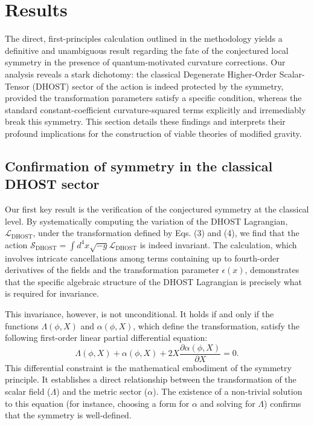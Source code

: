 \documentclass[twocolumn]{aastex631}
\begin{document}
\section{Results}
\label{sec:results}
The direct, first-principles calculation outlined in the methodology yields a definitive and unambiguous result regarding the fate of the conjectured local symmetry in the presence of quantum-motivated curvature corrections. Our analysis reveals a stark dichotomy: the classical Degenerate Higher-Order Scalar-Tensor (DHOST) sector of the action is indeed protected by the symmetry, provided the transformation parameters satisfy a specific condition, whereas the standard constant-coefficient curvature-squared terms explicitly and irremediably break this symmetry. This section details these findings and interprets their profound implications for the construction of viable theories of modified gravity.

\subsection{Confirmation of symmetry in the classical DHOST sector}

Our first key result is the verification of the conjectured symmetry at the classical level. By systematically computing the variation of the DHOST Lagrangian, $\mathcal{L}_{\text{DHOST}}$, under the transformation defined by Eqs. (3) and (4), we find that the action $\mathcal{S}_{\text{DHOST}} = \int d^4x \sqrt{-g} \mathcal{L}_{\text{DHOST}}$ is indeed invariant. The calculation, which involves intricate cancellations among terms containing up to fourth-order derivatives of the fields and the transformation parameter $\epsilon(x)$, demonstrates that the specific algebraic structure of the DHOST Lagrangian is precisely what is required for invariance.

This invariance, however, is not unconditional. It holds if and only if the functions $\Lambda(\phi, X)$ and $\alpha(\phi, X)$, which define the transformation, satisfy the following first-order linear partial differential equation:
\begin{equation}
\Lambda(\phi, X) + \alpha(\phi, X) + 2X \frac{\partial \alpha(\phi, X)}{\partial X} = 0.
\label{eq:dhost_condition}
\end{equation}
This differential constraint is the mathematical embodiment of the symmetry principle. It establishes a direct relationship between the transformation of the scalar field ($\Lambda$) and the metric sector ($\alpha$). The existence of a non-trivial solution to this equation (for instance, choosing a form for $\alpha$ and solving for $\Lambda$) confirms that the symmetry is well-defined.
\end{document}
